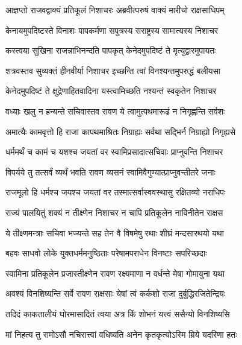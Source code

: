 
\twolineshloka
{आज्ञप्तो राजवद्वाक्यं प्रतिकूलं निशाचरः}
{अब्रवीत्परुषं वाक्यं मारीचो राक्षसाधिपम्} %

\twolineshloka
{केनायमुपदिष्टस्ते विनाशः पापकर्मणा}
{सपुत्रस्य सराष्ट्रस्य सामात्यस्य निशाचर} %

\twolineshloka
{कस्त्वया सुखिना राजन्नाभिनन्दति पापकृत्}
{केनेदमुपदिष्टं ते मृत्युद्वारमुपायतः} %

\twolineshloka
{शत्रवस्तव सुव्यक्तं हीनवीर्या निशाचर}
{इच्छन्ति त्वां विनश्यन्तमुपरुद्धं बलीयसा} %

\twolineshloka
{केनेदमुपदिष्टं ते क्षुद्रेणाहितवादिना}
{यस्त्वामिच्छति नश्यन्तं स्वकृतेन निशाचर} %

\twolineshloka
{वध्याः खलु न हन्यन्ते सचिवास्तव रावण}
{ये त्वामुत्पथमारूढं न निगृह्णन्ति सर्वशः} %

\twolineshloka
{अमात्यैः कामवृत्तो हि राजा कापथमाश्रितः}
{निग्राह्यः सर्वथा सद्भिर्न निग्राह्यो निगृह्यसे} %

\twolineshloka
{धर्ममर्थं च कामं च यशश्च जयतां वर}
{स्वामिप्रसादात्सचिवाः प्राप्नुवन्ति निशाचर} %

\twolineshloka
{विपर्यये तु तत्सर्वं व्यर्थं भवति रावण}
{व्यसनं स्वामिवैगुण्यात्प्राप्नुवन्तीतरे जनाः} %

\twolineshloka
{राजमूलो हि धर्मश्च जयश्च जयतां वर}
{तस्मात्सर्वास्ववस्थासु रक्षितव्यो नराधिपः} %

\twolineshloka
{राज्यं पालयितुं शक्यं न तीक्ष्णेन निशाचर}
{न चापि प्रतिकूलेन नाविनीतेन राक्षस} %

\twolineshloka
{ये तीक्ष्णमन्त्राः सचिवा भज्यन्ते सह तेन वै}
{विषमेषु रथाः शीघ्रं मन्दसारथयो यथा} %

\twolineshloka
{बहवः साधवो लोके युक्तधर्ममनुष्ठिताः}
{परेषामपराधेन विनष्टाः सपरिच्छदाः} %

\twolineshloka
{स्वामिना प्रतिकूलेन प्रजास्तीक्ष्णेन रावण}
{रक्ष्यमाणा न वर्धन्ते मेषा गोमायुना यथा} %

\twolineshloka
{अवश्यं विनशिष्यन्ति सर्वे रावण राक्षसाः}
{येषां त्वं कर्कशो राजा दुर्बुद्धिरजितेन्द्रियः} %

\twolineshloka
{तदिदं काकतालीयं घोरमासादितं त्वया}
{अत्र किं शोभनं यत्त्वं ससैन्यो विनशिष्यसि} %

\twolineshloka
{मां निहत्य तु रामोऽसौ नचिरात्त्वां वधिष्यति}
{अनेन कृतकृत्योऽस्मि म्रिये यदरिणा हतः} %

